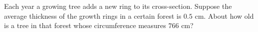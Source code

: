 Each year a growing tree adds a new ring to its cross-section. Suppose the average thickness of the growth rings in a certain forest is $0.5$ cm. About how old is a tree in that forest whose circumference measures $766$ cm?
